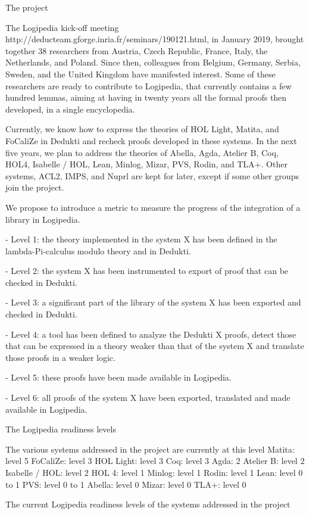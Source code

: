 The project

The Logipedia kick-off meeting
http://deducteam.gforge.inria.fr/seminars/190121.html, in January
2019, brought together 38 researchers from Austria, Czech Republic,
France, Italy, the Netherlands, and Poland. Since then, colleagues
from Belgium, Germany, Serbia, Sweden, and the United Kingdom have
manifested interest. Some of these researchers are ready to contribute
to Logipedia, that currently contains a few hundred lemmas, aiming at
having in twenty years all the formal proofs then developed, in a
single encyclopedia.

Currently, we know how to express the theories of HOL Light, Matita,
and FoCaliZe in Dedukti and recheck proofs developed in these
systems. In the next five years, we plan to address the theories of
Abella, Agda, Atelier B, Coq, HOL4, Isabelle / HOL, Lean, Minlog,
Mizar, PVS, Rodin, and TLA+. Other systems, ACL2, IMPS, and Nuprl are
kept for later, except if some other groups join the project.


We propose to introduce a metric to measure the progress of the
integration of a library in Logipedia.


- Level 1: the theory implemented in the system X has been defined in
the lambda-Pi-calculus modulo theory and in Dedukti.

- Level 2: the system X has been instrumented to export of proof that
can be checked in Dedukti.

- Level 3: a significant part of the library of the system X has been exported and checked in Dedukti.

- Level 4: a tool has been defined to analyze the Dedukti X proofs,
detect those that can be expressed in a theory weaker than that of the
system X and translate those proofs in a weaker logic.

- Level 5: these proofs have been made available in Logipedia.

- Level 6: all proofs of the system X have been exported, translated
and made available in Logipedia.

The Logipedia readiness levels

The various systems addressed in the project are currently at this level 
Matita: level 5
FoCaliZe: level 3
HOL Light: level 3
Coq: level 3
Agda: 2
Atelier B: level 2
Isabelle / HOL: level 2
HOL 4: level 1
Minlog: level 1
Rodin: level 1
Lean: level 0 to 1
PVS: level 0 to 1
Abella: level 0
Mizar: level 0
TLA+: level 0

The current Logipedia readiness levels of the systems addressed in the project

